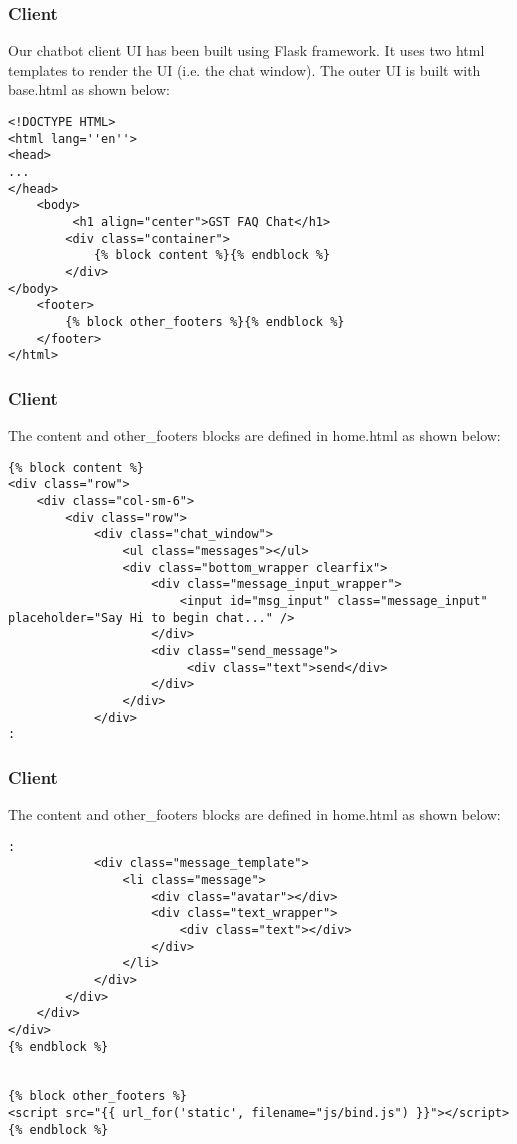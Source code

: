  \begin{frame}[fragile]\frametitle{Client}
 Our chatbot client UI has been built using Flask framework. It uses two html templates to render the UI (i.e. the chat window). 
 The outer UI is built with base.html as shown below:
 \tiny
\begin{lstlisting}
<!DOCTYPE HTML>
<html lang=''en''>
<head>
...
</head>
    <body>
         <h1 align="center">GST FAQ Chat</h1>
        <div class="container">
            {% block content %}{% endblock %}
        </div>
</body>
    <footer>
        {% block other_footers %}{% endblock %}
    </footer>
</html>
\end{lstlisting}
\end{frame}

 \begin{frame}[fragile]\frametitle{Client}
The content and other\_footers blocks are defined in home.html as shown below:
\tiny
\begin{lstlisting}
{% block content %}
<div class="row">
    <div class="col-sm-6">
        <div class="row">
            <div class="chat_window">
                <ul class="messages"></ul>
                <div class="bottom_wrapper clearfix">
                    <div class="message_input_wrapper">
                        <input id="msg_input" class="message_input" placeholder="Say Hi to begin chat..." />
                    </div>
                    <div class="send_message">
                         <div class="text">send</div>
                    </div>
                </div>
            </div>
:
\end{lstlisting}
\end{frame}

 \begin{frame}[fragile]\frametitle{Client}
The content and other\_footers blocks are defined in home.html as shown below:
\tiny
\begin{lstlisting}
:
            <div class="message_template">
                <li class="message">
                    <div class="avatar"></div>
                    <div class="text_wrapper">
                        <div class="text"></div>
                    </div>
                </li>
            </div>
        </div>
    </div>
</div>
{% endblock %}


{% block other_footers %}
<script src="{{ url_for('static', filename="js/bind.js") }}"></script>
{% endblock %}
\end{lstlisting}
\end{frame}



